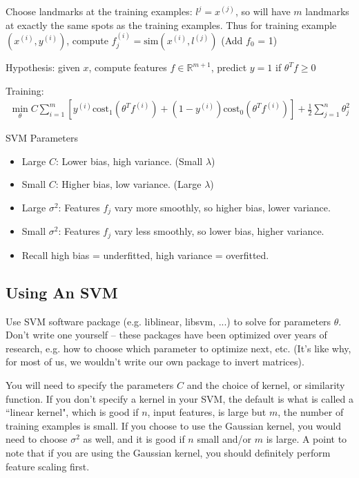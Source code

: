 \documentclass[letterpaper,10pt]{article}
\begin{document}
Choose landmarks at the training examples: $l^{j} = x^{(j)}$, so will have $m$ landmarks at exactly the same spots as the training examples. Thus for training example $(x^{(i)},y^{(i)})$, compute $f_j^{(i)} = \text{sim}(x^{(i)}, l^{(j)})$ (Add $f_0$ = 1)

Hypothesis: given $x$, compute features $f \in \mathbb{R}^{m+1}$, predict $y=1$ if $\theta^T f \geq 0$

Training:
\begin{align}
\min_\theta C \sum_{i=1}^m \left[ y^{(i)} \text{cost}_1(\theta^Tf^{(i)}) + (1-y^{(i)})\text{cost}_0(\theta^Tf^{(i)}) \right] + \frac{1}{2}\sum_{j=1}^n \theta_j^2
\end{align}

SVM Parameters
\begin{itemize}
	\item Large $C$: Lower bias, high variance. (Small $\lambda$)
	\item Small $C$: Higher bias, low variance. (Large $\lambda$)
	\item Large $\sigma^2$: Features $f_j$ vary more smoothly, so higher bias, lower variance.
	\item Small $\sigma^2$: Features $f_j$ vary less smoothly, so lower bias, higher variance.
	\item Recall high bias = underfitted, high variance = overfitted.
\end{itemize}

\subsection{Using An SVM}
Use SVM software package (e.g. liblinear, libsvm, ...) to solve for parameters $\theta$. Don't write one yourself -- these packages have been optimized over years of research, e.g. how to choose which parameter to optimize next, etc. (It's like why, for most of us, we wouldn't write our own package to invert matrices).

You will need to specify the parameters $C$ and the choice of kernel, or similarity function. If you don't specify a kernel in your SVM, the default is what is called a ``linear kernel", which is good if $n$, input features, is large but $m$, the number of training examples is small. If you choose to use the Gaussian kernel, you would need to choose $\sigma^2$ as well, and it is good if $n$ small and/or $m$ is large. A point to note that if you are using the Gaussian kernel, you should definitely perform feature scaling first.
\end{document}
